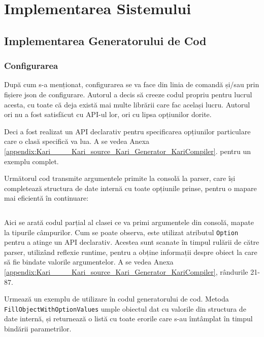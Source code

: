 \documentclass[a4paper,12pt]{report}
\begin{document}
\chapter{Implementarea Sistemului}\label{implementation_chapter_title}

\section{Implementarea Generatorului de Cod}

\subsection{Configurarea}

După cum s-a menționat, configurarea se va face din linia de comandă și/sau prin fișiere json de configurare.
Autorul a decis să creeze codul propriu pentru lucrul acesta, cu toate că deja există mai multe librării care fac același lucru.
Autorul ori nu a fost satisfăcut cu \ac{API}-ul lor, ori cu lipsa opțiunilor dorite.

Deci a fost realizat un \ac{API} declarativ pentru specificarea opțiunilor particulare care o clasă specifică va lua.
A se vedea Anexa \ref{appendix:Kari____Kari_source_Kari_Generator_KariCompiler}.
pentru un exemplu complet.

Următorul cod transmite argumentele primite la consolă la parser, care își completează structura de date internă cu toate opțiunile prinse, pentru o mapare mai eficientă în continuare:
\inputminted[firstline=126, lastline=132]{cs}{../Kari/source/Kari.Generator/KariCompiler.cs}

Aici se arată codul parțial al clasei ce va primi argumentele din consolă, mapate la tipurile câmpurilor.
Cum se poate observa, este utilizat atributul \texttt{Option} pentru a atinge un \ac{API} declarativ.
Acestea sunt scanate în timpul rulării de către parser, utilizând reflexie runtime, pentru a obține informații despre obiect la care să fie bindate valorile argumentelor.
A se vedea Anexa \ref{appendix:Kari____Kari_source_Kari_Generator_KariCompiler}, rândurile 21-87.

Urmează un exemplu de utilizare în codul generatorului de cod.
Metoda \texttt{FillObjectWithOptionValues} umple obiectul dat cu valorile din structura de date internă, și returnează o listă cu toate erorile care s-au îmtâmplat în timpul bindării parametrilor.
\inputminted[firstline=147, lastline=155]{cs}{../Kari/source/Kari.Generator/KariCompiler.cs}
\end{document}
